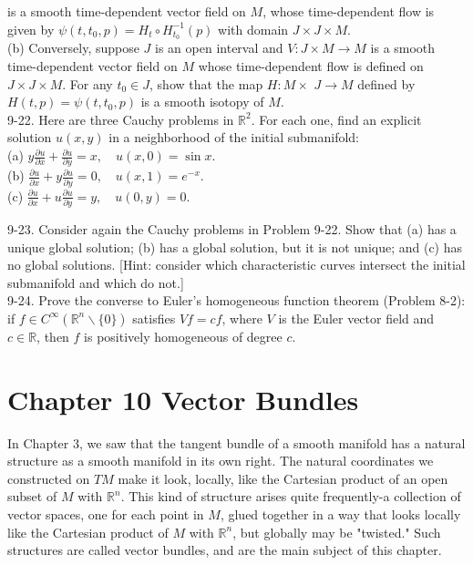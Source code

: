 \documentclass[10pt]{article}
\begin{document}
is a smooth time-dependent vector field on $M$, whose time-dependent flow is given by $\psi\left(t, t_{0}, p\right)=H_{t} \circ H_{t_{0}}^{-1}(p)$ with domain $J \times J \times M$.\\
(b) Conversely, suppose $J$ is an open interval and $V: J \times M \rightarrow M$ is a smooth time-dependent vector field on $M$ whose time-dependent flow is defined on $J \times J \times M$. For any $t_{0} \in J$, show that the map $H: M \times$ $J \rightarrow M$ defined by $H(t, p)=\psi\left(t, t_{0}, p\right)$ is a smooth isotopy of $M$.\\
9-22. Here are three Cauchy problems in $\mathbb{R}^{2}$. For each one, find an explicit solution $u(x, y)$ in a neighborhood of the initial submanifold:\\
(a) $y \frac{\partial u}{\partial x}+\frac{\partial u}{\partial y}=x, \quad u(x, 0)=\sin x$.\\
(b) $\frac{\partial u}{\partial x}+y \frac{\partial u}{\partial y}=0, \quad u(x, 1)=e^{-x}$.\\
(c) $\frac{\partial u}{\partial x}+u \frac{\partial u}{\partial y}=y, \quad u(0, y)=0$.

9-23. Consider again the Cauchy problems in Problem 9-22. Show that (a) has a unique global solution; (b) has a global solution, but it is not unique; and (c) has no global solutions. [Hint: consider which characteristic curves intersect the initial submanifold and which do not.]\\
9-24. Prove the converse to Euler's homogeneous function theorem (Problem 8-2): if $f \in C^{\infty}\left(\mathbb{R}^{n} \backslash\{0\}\right)$ satisfies $V f=c f$, where $V$ is the Euler vector field and $c \in \mathbb{R}$, then $f$ is positively homogeneous of degree $c$.

\section*{Chapter 10 Vector Bundles}
In Chapter 3, we saw that the tangent bundle of a smooth manifold has a natural structure as a smooth manifold in its own right. The natural coordinates we constructed on $T M$ make it look, locally, like the Cartesian product of an open subset of $M$ with $\mathbb{R}^{n}$. This kind of structure arises quite frequently-a collection of vector spaces, one for each point in $M$, glued together in a way that looks locally like the Cartesian product of $M$ with $\mathbb{R}^{n}$, but globally may be "twisted." Such structures are called vector bundles, and are the main subject of this chapter.
\end{document}
